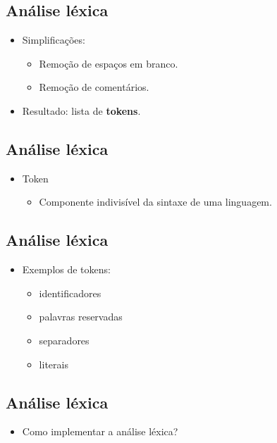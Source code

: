 \documentclass[11pt]{article}
\begin{document}
\subsection*{Análise léxica}
\label{sec:org9154b0e}

\begin{itemize}
\item Simplificações:
\begin{itemize}
\item Remoção de espaços em branco.
\item Remoção de comentários.
\end{itemize}

\item Resultado: lista de \textbf{\textbf{tokens}}.
\end{itemize}
\subsection*{Análise léxica}
\label{sec:orgbdef0fe}

\begin{itemize}
\item Token
\begin{itemize}
\item Componente indivisível da sintaxe de uma linguagem.
\end{itemize}
\end{itemize}
\subsection*{Análise léxica}
\label{sec:org31b7d2a}

\begin{itemize}
\item Exemplos de tokens:
\begin{itemize}
\item identificadores
\item palavras reservadas
\item separadores
\item literais
\end{itemize}
\end{itemize}
\subsection*{Análise léxica}
\label{sec:org69ba591}

\begin{itemize}
\item Como implementar a análise léxica?
\end{itemize}
\end{document}

